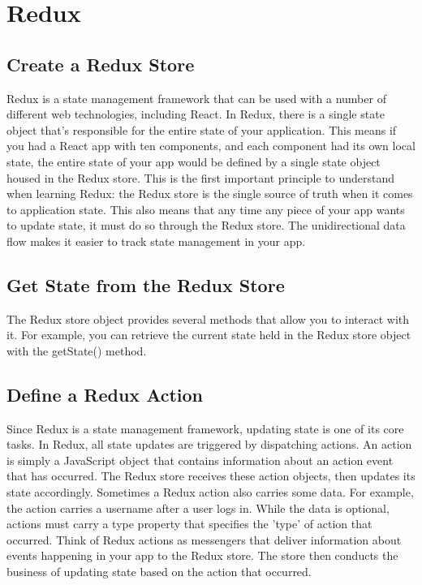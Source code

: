\documentclass{article}%
\begin{document}
%
\newpage%
\section{Redux}%
\label{sec:Redux}%
\subsection{Create a Redux Store}%
\label{subsec:CreateaReduxStore}%
Redux is a state management framework that can be used with a number of different web technologies, including React.\newline%
In Redux, there is a single state object that's responsible for the entire state of your application. This means if you had a React app with ten components, and each component had its own local state, the entire state of your app would be defined by a single state object housed in the Redux store. This is the first important principle to understand when learning Redux: the Redux store is the single source of truth when it comes to application state.\newline%
This also means that any time any piece of your app wants to update state, it must do so through the Redux store. The unidirectional data flow makes it easier to track state management in your app.\newline%

%
\subsection{Get State from the Redux Store}%
\label{subsec:GetStatefromtheReduxStore}%
The Redux store object provides several methods that allow you to interact with it. For example, you can retrieve the current state held in the Redux store object with the getState() method.\newline%

%
\subsection{Define a Redux Action}%
\label{subsec:DefineaReduxAction}%
Since Redux is a state management framework, updating state is one of its core tasks. In Redux, all state updates are triggered by dispatching actions. An action is simply a JavaScript object that contains information about an action event that has occurred. The Redux store receives these action objects, then updates its state accordingly. Sometimes a Redux action also carries some data. For example, the action carries a username after a user logs in. While the data is optional, actions must carry a type property that specifies the 'type' of action that occurred.\newline%
Think of Redux actions as messengers that deliver information about events happening in your app to the Redux store. The store then conducts the business of updating state based on the action that occurred.\newline%
\end{document}
